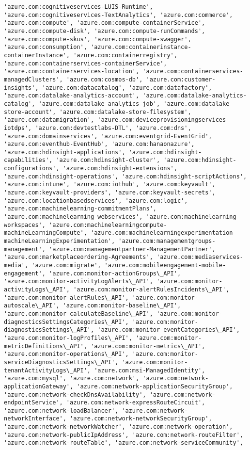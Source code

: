 \documentclass[11pt]{article}
\begin{document}
\begin{Verbatim}[commandchars=\\\{\}]
'azure.com:cognitiveservices-LUIS-Runtime', 'azure.com:cognitiveservices-TextAnalytics', 'azure.com:commerce', 'azure.com:compute', 'azure.com:compute-containerService', 'azure.com:compute-disk', 'azure.com:compute-runCommands', 'azure.com:compute-skus', 'azure.com:compute-swagger', 'azure.com:consumption', 'azure.com:containerinstance-containerInstance', 'azure.com:containerregistry', 'azure.com:containerservices-containerService', 'azure.com:containerservices-location', 'azure.com:containerservices-managedClusters', 'azure.com:cosmos-db', 'azure.com:customer-insights', 'azure.com:datacatalog', 'azure.com:datafactory', 'azure.com:datalake-analytics-account', 'azure.com:datalake-analytics-catalog', 'azure.com:datalake-analytics-job', 'azure.com:datalake-store-account', 'azure.com:datalake-store-filesystem', 'azure.com:datamigration', 'azure.com:deviceprovisioningservices-iotdps', 'azure.com:devtestlabs-DTL', 'azure.com:dns', 'azure.com:domainservices', 'azure.com:eventgrid-EventGrid', 'azure.com:eventhub-EventHub', 'azure.com:hanaonazure', 'azure.com:hdinsight-applications', 'azure.com:hdinsight-capabilities', 'azure.com:hdinsight-cluster', 'azure.com:hdinsight-configurations', 'azure.com:hdinsight-extensions', 'azure.com:hdinsight-operations', 'azure.com:hdinsight-scriptActions', 'azure.com:intune', 'azure.com:iothub', 'azure.com:keyvault', 'azure.com:keyvault-providers', 'azure.com:keyvault-secrets', 'azure.com:locationbasedservices', 'azure.com:logic', 'azure.com:machinelearning-commitmentPlans', 'azure.com:machinelearning-webservices', 'azure.com:machinelearning-workspaces', 'azure.com:machinelearningcompute-machineLearningCompute', 'azure.com:machinelearningexperimentation-machineLearningExperimentation', 'azure.com:managementgroups-management', 'azure.com:managementpartner-ManagementPartner', 'azure.com:marketplaceordering-Agreements', 'azure.com:mediaservices-media', 'azure.com:migrate', 'azure.com:mobileengagement-mobile-engagement', 'azure.com:monitor-actionGroups\_API', 'azure.com:monitor-activityLogAlerts\_API', 'azure.com:monitor-activityLogs\_API', 'azure.com:monitor-alertRulesIncidents\_API', 'azure.com:monitor-alertRules\_API', 'azure.com:monitor-autoscale\_API', 'azure.com:monitor-baseline\_API', 'azure.com:monitor-calculateBaseline\_API', 'azure.com:monitor-diagnosticsSettingsCategories\_API', 'azure.com:monitor-diagnosticsSettings\_API', 'azure.com:monitor-eventCategories\_API', 'azure.com:monitor-logProfiles\_API', 'azure.com:monitor-metricDefinitions\_API', 'azure.com:monitor-metrics\_API', 'azure.com:monitor-operations\_API', 'azure.com:monitor-serviceDiagnosticsSettings\_API', 'azure.com:monitor-tenantActivityLogs\_API', 'azure.com:msi-ManagedIdentity', 'azure.com:mysql', 'azure.com:network', 'azure.com:network-applicationGateway', 'azure.com:network-applicationSecurityGroup', 'azure.com:network-checkDnsAvailability', 'azure.com:network-endpointService', 'azure.com:network-expressRouteCircuit', 'azure.com:network-loadBalancer', 'azure.com:network-networkInterface', 'azure.com:network-networkSecurityGroup', 'azure.com:network-networkWatcher', 'azure.com:network-operation', 'azure.com:network-publicIpAddress', 'azure.com:network-routeFilter', 'azure.com:network-routeTable', 'azure.com:network-serviceCommunity', 
\end{Verbatim}
\end{document}
